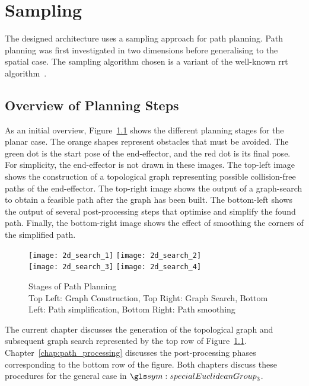 \chapter{Sampling}%
\label{chap:sampling}

	The designed architecture uses a sampling approach for path planning. Path
	planning was first investigated in two dimensions before generalising to the
	spatial case. The sampling algorithm chosen is a variant
	of the well-known \gls{rrt}
	algorithm~\cite{bib:planning:rapidly-exploring_random_trees_a_new_tool_for_path_planning}.

	\section{Overview of Planning Steps}

		As an initial overview, Figure~\ref{fig:path_planning_in_2d} shows the
		different planning stages for the planar case. The orange shapes
		represent obstacles that must be avoided. The green dot is the start
		pose of the end-effector, and the red dot is its final pose. For
		simplicity, the end-effector is not drawn in these images. The top-left
		image shows the construction of a topological graph representing
		possible collision-free paths of the end-effector. The top-right image
		shows the output of a graph-search to obtain a feasible path after the
		graph has been built. The bottom-left shows the output of several
		post-processing steps that optimise and simplify the found path.
		Finally, the bottom-right image shows the effect of smoothing the
		corners of the simplified path.

		\begin{figure}[htb]
			\centering
				\texttt{[image: 2d\_search\_1]}%
				\texttt{[image: 2d\_search\_2]}\\
				\texttt{[image: 2d\_search\_3]}%
				\texttt{[image: 2d\_search\_4]}
			\caption[Stages of Path Planning]
				{
					Stages of Path Planning\\
					Top Left: Graph Construction,
					Top Right: Graph Search,
					Bottom Left: Path simplification,
					Bottom Right: Path smoothing
				}
			\label{fig:path_planning_in_2d}
		\end{figure}

		The current chapter discusses the generation of the topological graph
		and subsequent graph search represented by the top row of
		Figure~\ref{fig:path_planning_in_2d}. Chapter~\ref{chap:path_processing}
		discusses the post-processing phases corresponding to the bottom row of
		the figure.  Both chapters discuss these procedures for the general case
		in $\specialEuclideanGroup{3}$.

	
	
	
	

